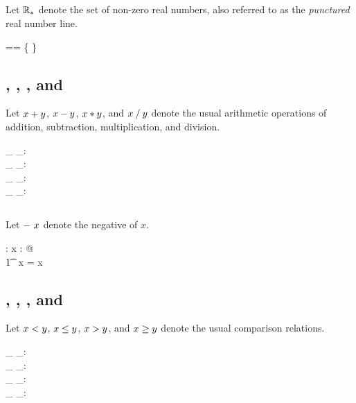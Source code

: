 \documentclass[11pt, oneside]{article}
\begin{document}
\subsection{}

Let $\mathbb{R}_{*}$ denote the set of non-zero real numbers, 
also referred to as the {\it punctured} real number line.

\begin{zed}
	\Rnz == \R \setminus \{ \zeroR \}
\end{zed}

\subsection{, , , and }

Let $x \mathbin{+} y$, $x \mathbin{-} y$, $x \mathbin{*} y$, and $x \mathbin{/} y$ denote the usual arithmetic operations of
addition, subtraction, multiplication, and division.

\begin{axdef}
	\_ \addR \_: \R \cross \R \fun \R \\
	\_ \subR \_: \R \cross \R \fun \R \\
	\_ \mulR \_: \R \cross \R \fun \R \\
	\_ \divR \_: \R \cross \Rnz \fun \R
\end{axdef}

\subsection{}

Let $-~x$ denote the negative of $x$.

\begin{axdef}
	\negR: \R \fun \R
\where
	\forall x : \R @ \\
	\t1	\negR~x = \zeroR \subR x
\end{axdef}

\subsection{, , , and }

Let $x \mathrel{<} y$, $x \mathrel{\leq} y$, $x \mathrel{>} y$, and $x \mathrel{\geq} y$ denote the usual comparison relations.

\begin{axdef}
	\_ \ltR \_: \R \rel \R \\
	\_ \leR \_: \R \rel \R \\
	\_ \gtR \_: \R \rel \R \\
	\_ \geR \_: \R \rel \R
\end{axdef}
\end{document}
